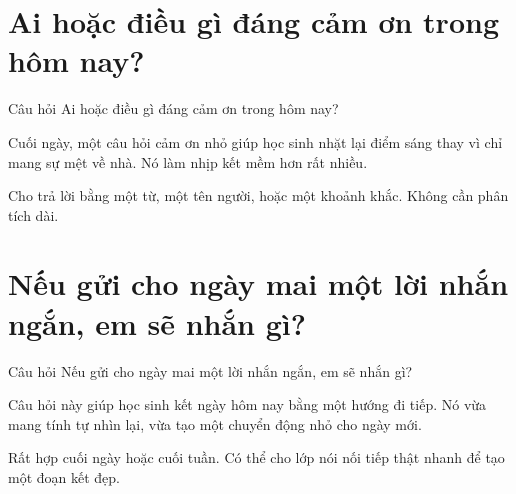 \section{Ai hoặc điều gì đáng cảm ơn trong hôm nay?}
\begin{cauhoibox}{Câu hỏi}
Ai hoặc điều gì đáng cảm ơn trong hôm nay?
\end{cauhoibox}
\begin{taisaocoich}
Cuối ngày, một câu hỏi cảm ơn nhỏ giúp học sinh nhặt lại điểm sáng thay vì chỉ mang sự mệt về nhà. Nó làm nhịp kết mềm hơn rất nhiều.
\end{taisaocoich}
\begin{goiybien}
Cho trả lời bằng một từ, một tên người, hoặc một khoảnh khắc. Không cần phân tích dài.
\end{goiybien}
\ngancach

\section{Nếu gửi cho ngày mai một lời nhắn ngắn, em sẽ nhắn gì?}
\begin{cauhoibox}{Câu hỏi}
Nếu gửi cho ngày mai một lời nhắn ngắn, em sẽ nhắn gì?
\end{cauhoibox}
\begin{taisaocoich}
Câu hỏi này giúp học sinh kết ngày hôm nay bằng một hướng đi tiếp. Nó vừa mang tính tự nhìn lại, vừa tạo một chuyển động nhỏ cho ngày mới.
\end{taisaocoich}
\begin{goiybien}
Rất hợp cuối ngày hoặc cuối tuần. Có thể cho lớp nói nối tiếp thật nhanh để tạo một đoạn kết đẹp.
\end{goiybien}
